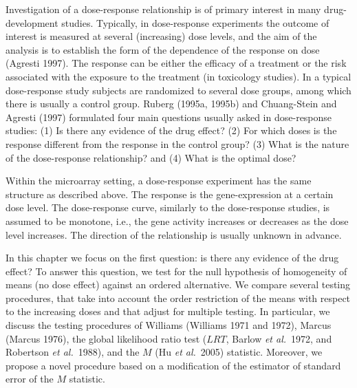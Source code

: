 \documentclass[10pt]{article}
\begin{document}
Investigation of a dose-response relationship is of primary interest
in many drug-development studies. Typically, in dose-response
experiments the outcome of interest is measured at several
(increasing) dose levels, and the aim  of the analysis is to
establish the form of the dependence of the response on dose
(Agresti 1997). The response can be either the efficacy of a
treatment or the risk associated with the exposure to the treatment
(in toxicology studies). In a typical dose-response study subjects
are randomized to several dose groups, among which there is usually
a control group. Ruberg (1995a, 1995b) and Chuang-Stein and Agresti
(1997) formulated four main questions usually asked in dose-response
studies: (1) Is there any evidence of the drug effect? (2) For which
doses is the response different from the response in the control
group? (3) What is the nature of the dose-response relationship? and
(4) What is the optimal dose?

Within the microarray setting, a dose-response experiment has the
same structure as described above. The response is the
gene-expression at a certain dose level. The dose-response curve,
similarly to the dose-response studies, is assumed to be monotone,
i.e., the gene activity increases or decreases as the dose level
increases. The direction of the relationship is usually unknown in
advance.

In this chapter we focus on the first question: is there any
evidence of the drug effect? To answer this question, we test for
the null hypothesis of homogeneity of means (no dose effect) against
an ordered alternative. We compare several testing procedures, that
take into account the order restriction of the means with respect to
the increasing doses and that adjust for multiple testing. In
particular, we discuss the testing procedures of Williams (Williams
1971 and 1972), Marcus (Marcus 1976), the global likelihood ratio
test ($LRT$, Barlow \textit{et al.}\ 1972, and Robertson \textit{et
al.}\ 1988), and the $M$ (Hu \textit{et al.}\ 2005) statistic.
Moreover, we propose a novel procedure based on a modification of
the estimator of standard error of the $M$ statistic.
\end{document}

